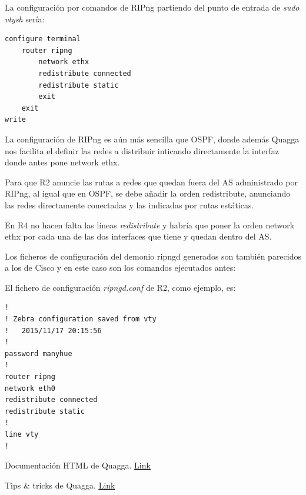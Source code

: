 \documentclass{article}
\begin{document}
La configuración por comandos de RIPng partiendo del punto de entrada de \textit{sudo vtysh} sería:

\hfil

\begin{BVerbatim}
configure terminal
	router ripng
		network ethx
		redistribute connected
		redistribute static
		exit
	exit
write
\end{BVerbatim}

La configuración de RIPng es aún más sencilla que OSPF, donde además Quagga nos facilita el definir las redes a distribuir inticando directamente la interfaz donde antes pone network ethx.

Para que R2 anuncie las rutas a redes que quedan fuera del AS administrado por RIPng, al igual que en OSPF, se debe añadir la orden redistribute, anunciando las redes directamente conectadas y las indicadas por rutas estáticas.

En R4 no hacen falta las líneas \textit{redistribute} y habría que poner la orden network ethx por cada una de las dos interfaces que tiene y quedan dentro del AS.

Los ficheros de configuración del demonio ripngd generados son también parecidos a los de Cisco y en este caso son los comandos ejecutados antes:


\hfil

El fichero de configuración \textit{ripngd.conf} de R2, como ejemplo, es:

\begin{lstlisting}
!
! Zebra configuration saved from vty
!   2015/11/17 20:15:56
!
password manyhue
!
router ripng
network eth0
redistribute connected
redistribute static
!
line vty
!
\end{lstlisting}




\begin{thebibliography}{99}
	Documentación HTML de Quagga.  \hyperref{http://www.nongnu.org/quagga/docs/docs-info.html}{}{}{\underline{Link}}
	
	Tips \& tricks de Quagga. 
	\hyperref{https://wiki.quagga.net/wiki/index.php/TipsNTricks}{}{}{\underline{Link}}
	
\end{thebibliography}
\end{document}

